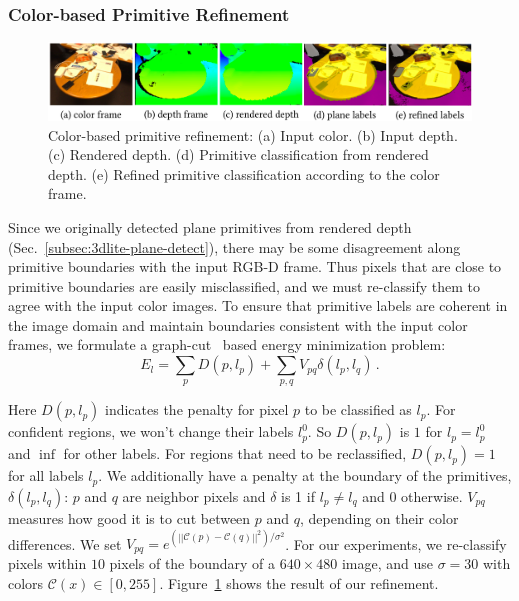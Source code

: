 \subsubsection{Color-based Primitive Refinement}
\label{subsec:color-plane-refine}
\begin{figure}
    \centering
    \includegraphics[width=\linewidth]{3dlite/fig4.png}
    \caption{Color-based primitive refinement: (a) Input color. (b) Input depth. (c) Rendered depth. (d) Primitive classification from rendered depth. (e) Refined primitive classification according to the color frame.}
    \label{fig:3dlite-color-boundary-refine}
\end{figure}
Since we originally detected plane primitives from rendered depth (Sec.~\ref{subsec:3dlite-plane-detect}), there may be some disagreement along primitive boundaries with the input RGB-D frame.
Thus pixels that are close to primitive boundaries are easily misclassified, and we must re-classify them to agree with the input color images. 
To ensure that primitive labels are coherent in the image domain and maintain boundaries consistent with the input color frames, we formulate a graph-cut~\cite{boykov2001fast} based energy minimization problem:
\begin{equation}
E_l = \sum_p D(p, l_p) + \sum_{p,q} V_{pq}\delta(l_p,l_q)\,.
\label{eq:color-boundary-refine}
\end{equation}

Here $D(p,l_p)$ indicates the penalty for pixel $p$ to be classified as $l_p$. 
For confident regions, we won't change their labels $l_p^0$. 
So $D(p,l_p)$ is $1$ for $l_p=l_p^0$ and $\inf$ for other labels. 
For regions that need to be reclassified, $D(p,l_p)=1$ for all labels $l_p$. 
We additionally have a penalty at the boundary of the primitives, $\delta(l_p,l_q)$: $p$ and $q$ are neighbor pixels and $\delta$ is 1 if $l_p\neq l_q$ and 0 otherwise. 
$V_{pq}$ measures how good it is to cut between $p$ and $q$, depending on their color differences. We set
$V_{pq}=e^{\left(||\mathcal{C}(p)-\mathcal{C}(q)||^2\right)/\sigma^2}$.  %
For our experiments, we re-classify pixels within $10$ pixels of the boundary of a $640\times 480$ image, and use $\sigma=30$ with colors $\mathcal{C}(x)\in[0,255]$.
Figure~\ref{fig:3dlite-color-boundary-refine} shows the result of our refinement.

